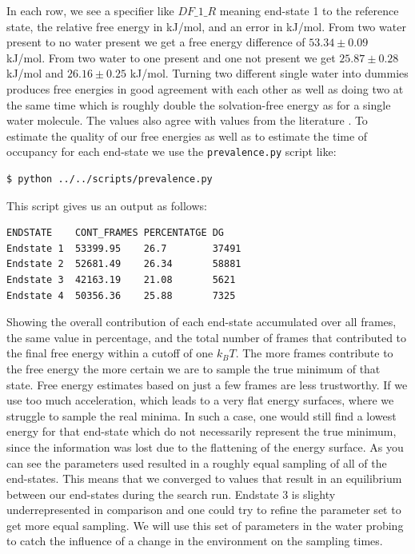 In each row, we see a specifier like $DF\_1\_R$ meaning end-state 1 to the reference state, the relative free energy in kJ/mol, and an error in kJ/mol. From two water present to no water present we get a free energy difference of $53.34 \pm 0.09$ kJ/mol. From two water to one present and one not present we get $25.87 \pm 0.28$ kJ/mol and $26.16 \pm 0.25$ kJ/mol. Turning two different single water into dummies produces free energies in good agreement with each other as well as doing two at the same time which is roughly double the solvation-free energy as for a single water molecule. The values also agree with values from the literature \cite{gracia1}. To estimate the quality of our free energies as well as to estimate the time of occupancy for each end-state we use the \texttt{prevalence.py} script like:

\begin{lstlisting}
$ python ../../scripts/prevalence.py
\end{lstlisting}

This script gives us an output as follows: 

\begin{lstlisting}
ENDSTATE    CONT_FRAMES PERCENTATGE DG
Endstate 1  53399.95    26.7        37491
Endstate 2  52681.49    26.34       58881
Endstate 3  42163.19    21.08       5621
Endstate 4  50356.36    25.88       7325
\end{lstlisting}

Showing the overall contribution of each end-state accumulated over all frames, the same value in percentage, and the total number of frames that contributed to the final free energy within a cutoff of one $k_BT$. The more frames contribute to the free energy the more certain we are to sample the true minimum of that state. Free energy estimates based on just a few frames are less trustworthy. If we use too much acceleration, which leads to a very flat energy surfaces, where we struggle to sample the real minima. In such a case, one would still find a lowest energy for that end-state which do not necessarily represent the true minimum, since the information was lost due to the flattening of the energy surface. 
As you can see the parameters used resulted in a roughly equal sampling of all of the end-states. This means that we converged to values that result in an equilibrium between our end-states during the search run. Endstate 3 is slighty underrepresented in comparison and one could try to refine the parameter set to get more equal sampling. We will use this set of parameters in the water probing to catch the influence of a change in the environment on the sampling times.

